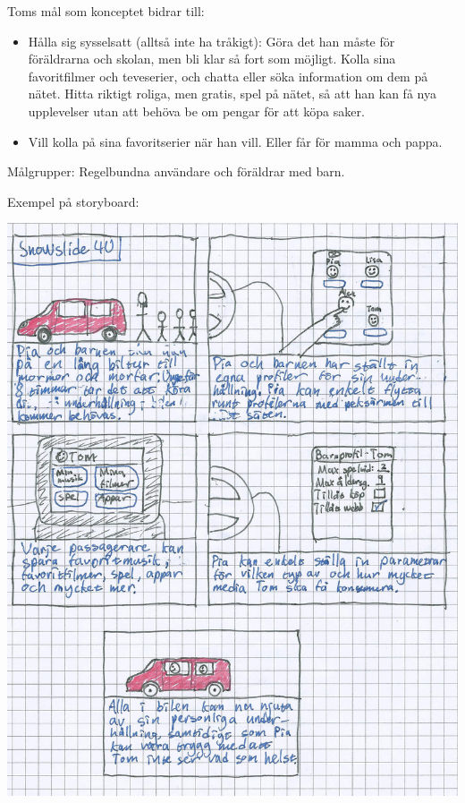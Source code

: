 \documentclass[a4paper,12pt,titlepage]{article}
\begin{document}
Toms mål som konceptet bidrar till:
\begin{itemize}
    \item Hålla sig sysselsatt (alltså inte ha
        tråkigt): Göra det han måste för
        föräldrarna och skolan, men bli klar så
        fort som möjligt. Kolla sina
        favoritfilmer och teveserier, och chatta
        eller söka information om dem på
        nätet. Hitta riktigt roliga, men gratis,
        spel på nätet, så att han kan få nya
        upplevelser utan att behöva be om
        pengar för att köpa saker. 
    \item Vill kolla på sina favoritserier när
        han vill. Eller får för mamma och
        pappa.
\end{itemize}

Målgrupper: Regelbundna användare och föräldrar med barn.

Exempel på storyboard:

\begin{center}
\includegraphics[width=15cm]{images/4u.jpg}
\end{center}
\end{document}
